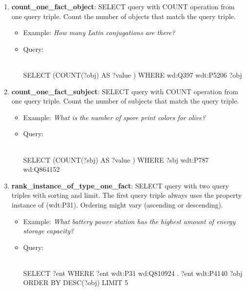 \begin{enumerate}
    \item \textbf{count\_one\_fact\_object}: SELECT query with COUNT operation from one query triple. 
    Count the number of objects that match the query triple.
    \begin{itemize}
        \item Example: \textit{How many Latin conjugations are there?}
        \item Query:\\
        \mbox{}\\
        \begin{sparqlcode}[]
SELECT (COUNT(?obj) AS ?value ) WHERE { 
    wd:Q397 wdt:P5206 ?obj 
}
        \end{sparqlcode}
    \end{itemize}

    \item \textbf{count\_one\_fact\_subject}: SELECT query with COUNT operation from one query triple. 
    Count the number of subjects that match the query triple.
    \begin{itemize}
        \item Example: \textit{What is the number of spore print colors for olive?}
        \item Query:\\
        \mbox{}\\
        \begin{sparqlcode}[]
SELECT (COUNT(?sbj) AS ?value ) WHERE { 
    ?sbj wdt:P787 wd:Q864152 
}
        \end{sparqlcode}
    \end{itemize}

    \item \textbf{rank\_instance\_of\_type\_one\_fact}: SELECT query with two query triples with 
    sorting and limit. The first query triple always uses the property instance of (wdt:P31). 
    Ordering might vary (ascending or descending).
    \begin{itemize}
        \item Example: \textit{What battery power station has the highest amount of energy storage 
        capacity?}
        \item Query:\\
        \mbox{}\\
        \begin{sparqlcode}[]
SELECT ?ent WHERE { 
    ?ent wdt:P31 wd:Q810924 . 
    ?ent wdt:P4140 ?obj 
} ORDER BY DESC(?obj) LIMIT 5
        \end{sparqlcode}
    \end{itemize}
    

\end{enumerate}
